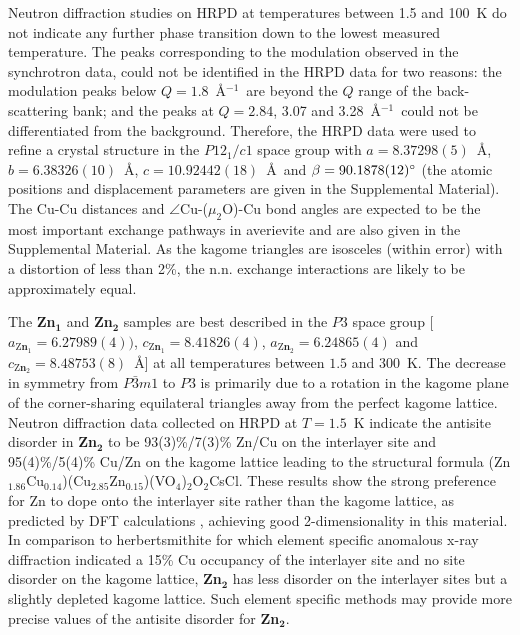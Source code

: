 \documentclass[
sn-nature,
Numbered,
iicol]
{sn-jnl}%
\newcommand{\Ang}{\AA$^{-1}$}
\begin{document}
Neutron diffraction studies on HRPD at temperatures between 1.5 and 100~K  do not indicate any further phase transition down to the lowest measured temperature.
The peaks corresponding to the modulation observed in the synchrotron data, could not be identified in the HRPD data for two reasons: the modulation peaks below $Q=1.8$~\Ang\ are beyond the $Q$ range of the back-scattering bank; and the peaks at $Q=2.84$, 3.07 and 3.28~\Ang\ could not be differentiated from the background.
Therefore, the HRPD data were used to refine a crystal structure in the $P12_1/c1$ space group with $a = 8.37298(5)$~\AA, $b = 6.38326(10)$~\AA, $c = 10.92442(18)$~\AA\ and $\beta = 90.1878(12)\degree$ (the atomic positions and displacement parameters are given in the Supplemental Material).
The Cu-Cu distances and $\angle$Cu-($\mu _2$O)-Cu bond angles are expected to be the most important exchange pathways in averievite and are also given in the Supplemental Material. 
As the kagome triangles are isosceles (within error) with a distortion of less than 2\%, the n.n. exchange interactions are likely to be approximately equal. 


The {\bf Zn$\mathbf {_1}$} and {\bf Zn$\mathbf {_2}$} samples are best described in the $P3$ space group [$a_{\mathbf {\mathrm Zn}{_1}}=6.27989(4))$, $c_{\mathbf {\mathrm Zn}{_1}}=8.41826(4)$, $a_{\mathbf {\mathrm Zn}{_2}}=6.24865(4)$ and $c_{\mathbf {\mathrm Zn}{_2}}=8.48753(8)$~\AA] at all temperatures between $1.5$ and $300$~K.
The decrease in symmetry from $P\bar{3}m1$ to $P3$ is primarily due to a rotation in the kagome plane of the corner-sharing equilateral triangles away from the perfect kagome lattice. 
Neutron diffraction data collected on HRPD at $T=1.5$~K indicate the antisite disorder in  {\bf Zn$\mathbf {_2}$} to be 93(3)\%/7(3)\% Zn/Cu on the interlayer site and 95(4)\%/5(4)\% Cu/Zn on the kagome lattice leading to the structural formula (Zn$_{1.86}$Cu$_{0.14}$)(Cu$_{2.85}$Zn$_{0.15}$)(VO$_4$)$_2$O$_2$CsCl. 
These results show the strong preference for Zn to dope onto the interlayer site rather than the kagome lattice, as predicted by DFT calculations \cite{Botana2018}, achieving good 2-dimensionality in this material.  
In comparison to herbertsmithite for which element specific anomalous x-ray diffraction indicated a 15\% Cu occupancy of the interlayer site and no site disorder on the kagome lattice, {\bf Zn$\mathbf {_2}$} has less disorder on the interlayer sites but a slightly depleted kagome lattice. 
Such element specific methods may provide more precise values of the antisite disorder for  {\bf Zn$\mathbf {_2}$}.  
\end{document}
